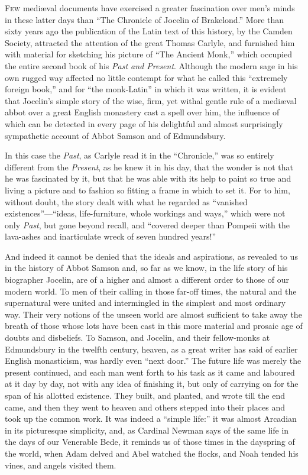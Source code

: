 \documentclass{book}
\begin{document}
{{\lettrine[lines=4]{\color{BrickRed}F}{ew} medi\ae{}val documents have exercised a greater fascination over men's minds in these latter days than ``The Chronicle of Jocelin of Brakelond.'' More than sixty years ago the publication of the Latin text of this history, by the Camden Society, attracted the attention of the great Thomas Carlyle, and furnished him with material for sketching his picture of ``The Ancient Monk,'' which occupied the entire second book of his \emph{Past and Present}. Although the modern sage in his own rugged way affected no little contempt for what he called this ``extremely foreign book,'' and for ``the monk-Latin'' in which it was written, it is evident that Jocelin's simple story of the wise, firm, yet withal gentle rule of a medi\ae{}val abbot over a great English monastery cast a spell over him, the influence of which can be detected in every page of his delightful and almost surprisingly sympathetic account of Abbot Samson and of Edmundsbury.

In this case the \emph{Past}, as Carlyle read it in the ``Chronicle,'' was so entirely different from the \emph{Present}, as he knew it in his day, that the wonder is not that he was fascinated by it, but that he was able with its help to paint so true and living a picture and to fashion so fitting a frame in which to set it. For to him, without doubt, the story dealt with what he regarded as ``vanished existences''---``ideas, life-furniture, whole workings and ways,'' which were not only \emph{Past}, but gone beyond recall, and ``covered deeper than Pompeii with the lava-ashes and inarticulate wreck of seven hundred years!''

And indeed it cannot be denied that the ideals and aspirations, as revealed to us in the history of Abbot Samson and, so far as we know, in the life story of his biographer Jocelin, are of a higher and almost a different order to those of our modern world. To men of their calling in those far-off times, the natural and the supernatural were united and intermingled in the simplest and most ordinary way. Their very notions of the unseen world are almost sufficient to take away the breath of those whose lots have been cast in this more material and prosaic age of doubts and disbeliefs. To Samson, and Jocelin, and their fellow-monks at Edmundsbury in the twelfth century, heaven, as a great writer has said of earlier English monasticism, was hardly even ``next door.'' The future life was merely the present continued, and each man went forth to his task as it came and laboured at it day by day, not with any idea of finishing it, but only of carrying on for the span of his allotted existence. They built, and planted, and wrote till the end came, and then they went to heaven and others stepped into their places and took up the common work. It was indeed a ``simple life:'' it was almost Arcadian in its picturesque simplicity, and, as Cardinal Newman says of the same life in the days of our Venerable Bede, it reminds us of those times in the dayspring of the world, when Adam delved and Abel watched the flocks, and Noah tended his vines, and angels visited them.

}}
\end{document}
